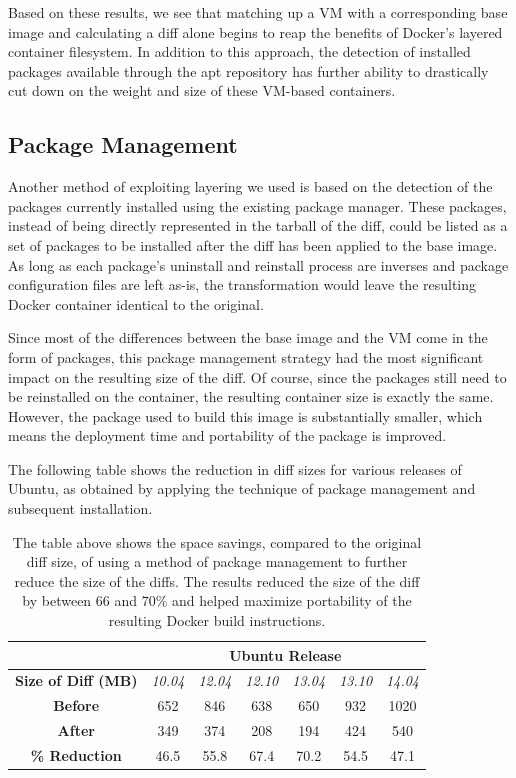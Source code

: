 \documentclass[\myfontsize, letterpaper]{article}
\begin{document}
Based on these results, we see that matching up a VM with a corresponding base image and calculating a diff alone begins to reap the benefits of Docker's layered container filesystem. In addition to this approach, the detection of installed packages available through the apt repository has further ability to drastically cut down on the weight and size of these VM-based containers.

\subsection{Package Management}

Another method of exploiting layering we used is based on the detection of the packages currently installed using the existing package manager. These packages, instead of being directly represented in the tarball of the diff, could be listed as a set of packages to be installed after the diff has been applied to the base image. As long as each package's uninstall and reinstall process are inverses and package configuration files are left as-is, the transformation would leave the resulting Docker container identical to the original.

Since most of the differences between the base image and the VM come in the form of packages, this package management strategy had the most significant impact on the resulting size of the diff. Of course, since the packages still need to be reinstalled on the container, the resulting container size is exactly the same. However, the package used to build this image is substantially smaller, which means the deployment time and portability of the package is improved.

The following table shows the reduction in diff sizes for various releases of Ubuntu, as obtained by applying the technique of package management and subsequent installation.

\begin{table}[h]
\centering
    \begin{tabular}{| c | c | c | c | c | c | c |}
    \hline
& \multicolumn{6}{|c|}{\bfseries Ubuntu Release} \\ \hline
    \bfseries Size of Diff (MB) & \itshape 10.04 & \itshape 12.04 & \itshape 12.10 & \itshape 13.04 & \itshape 13.10 & \itshape 14.04 \\ \hline
    \bfseries Before & 652 & 846 & 638 & 650 & 932 & 1020\\ \hline
    \bfseries After & 349 & 374 & 208 & 194 & 424 & 540  \\ \hline \hline
    \bfseries \% Reduction & 46.5 & 55.8 & 67.4 & 70.2 & 54.5 & 47.1\\
    \hline
    \end{tabular}
\caption{The table above shows the space savings, compared to the original diff size, of using a method of package management to further reduce the size of the diffs. The results reduced the size of the diff by between 66 and 70\%  and helped maximize portability of the resulting Docker build instructions.}
\label{table:diff}
\end{table}
\end{document}
